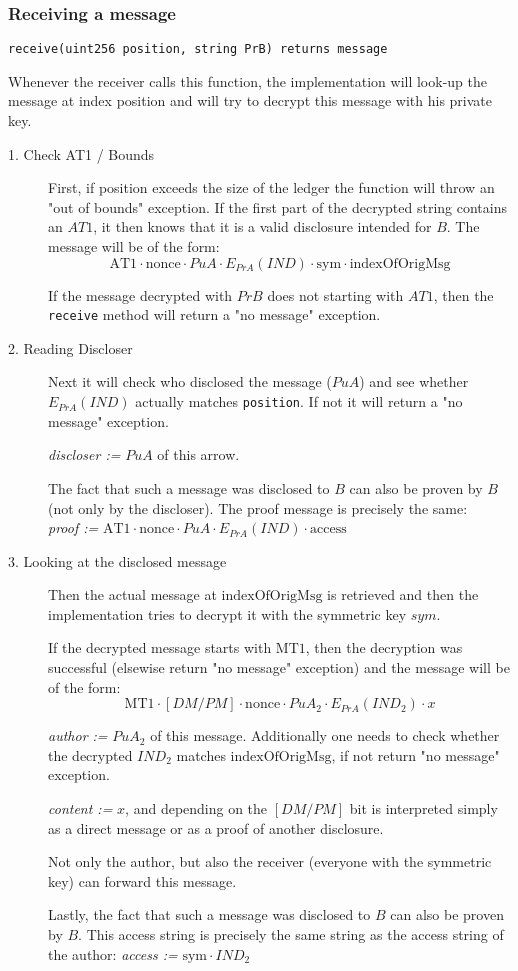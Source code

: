 \documentclass[a4paper]{article} %
\begin{document}
\subsubsection{Receiving a message}
\lstinline{receive(uint256 position, string PrB) returns message}

Whenever the receiver calls this function, the implementation will look-up the message at index position and will try to decrypt this message with his private key.
\begin{description}
\item[1. Check AT1 / Bounds]
First, if position exceeds the size of the ledger the function will throw an "out of bounds" exception.
If the first part of the decrypted string contains an $AT1$, it then knows that it is a valid disclosure intended for $B$. The message will be of the form:
$$\text{AT1} \cdot \text{nonce} \cdot PuA \cdot E_{PrA}(IND) \cdot \text{sym} \cdot \text{indexOfOrigMsg}$$

If the message decrypted with $PrB$ does not starting with $AT1$, then the \lstinline{receive} method will return a "no message" exception.

\item[2. Reading Discloser]
Next it will check who disclosed the message ($PuA$) and see whether $E_{PrA}(IND)$ actually matches \lstinline{position}. If not it will return a "no message" exception.

\textit{discloser :=} $PuA$ of this arrow.

The fact that such a message was disclosed to $B$ can also be proven by $B$ (not only by the discloser). The proof message is precisely the same: \\
\textit{proof :=} $\text{AT1} \cdot \text{nonce} \cdot PuA \cdot E_{PrA}(IND) \cdot \text{access}$

\item[3. Looking at the disclosed message] Then the actual message at $\text{indexOfOrigMsg}$ is retrieved and then the implementation tries to decrypt it with the symmetric key $sym$.

If the decrypted message starts with $\text{MT1}$, then the decryption was successful (elsewise return "no message" exception) and the message will be of the form:
$$\text{MT1} \cdot [DM/PM] \cdot \text{nonce} \cdot PuA_2 \cdot E_{PrA}(IND_2) \cdot x$$

\textit{author :=} $PuA_2$ of this message.
Additionally one needs to check whether the decrypted $IND_2$ matches $\text{indexOfOrigMsg}$, if not return "no message" exception.

\textit{content :=} $x$, and depending on the $[DM/PM]$ bit is interpreted simply as a direct message or as a proof of another disclosure.

Not only the author, but also the receiver (everyone with the symmetric key) can forward this message. 

Lastly, the fact that such a message was disclosed to $B$ can also be proven by $B$. This access string is precisely the same string as the access string of the author:
\textit{access :=} $\text{sym} \cdot IND_2$

\end{description}
\end{document}
